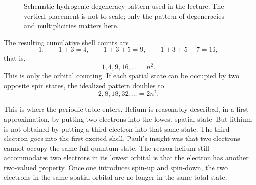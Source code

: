 \begin{figure}
\caption{Schematic hydrogenic degeneracy pattern used in the lecture. The vertical placement is not to scale; only the pattern of degeneracies and multiplicities matters here.}
\end{figure}

The resulting cumulative shell counts are
\begin{equation}
1,\qquad 1+3=4,\qquad 1+3+5=9,\qquad 1+3+5+7=16,
\end{equation}
that is,
\begin{equation}
1,4,9,16,\ldots=n^{2}.
\end{equation}
This is only the orbital counting. If each spatial state can be occupied by two opposite spin states, the idealized pattern doubles to
\begin{equation}
2,8,18,32,\ldots = 2n^{2}.
\end{equation}

This is where the periodic table enters. Helium is reasonably described, in a first approximation, by putting two electrons into the lowest spatial state. But lithium is not obtained by putting a third electron into that same state. The third electron goes into the first excited shell. Pauli's insight was that two electrons cannot occupy the same full quantum state. The reason helium still accommodates two electrons in its lowest orbital is that the electron has another two-valued property. Once one introduces spin-up and spin-down, the two electrons in the same spatial orbital are no longer in the same total state.

